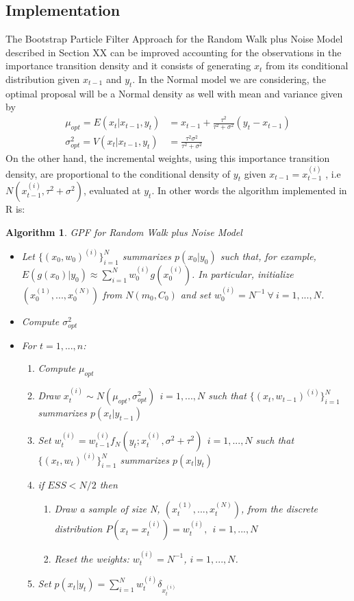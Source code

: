 \documentclass[
]{book}
\theoremstyle{break}
\theoremstyle{nonumberplain}
\newtheorem{algorithm}{Algorithm}[section]
\begin{document}
\subsection{Implementation}

\hfill\break
The Bootstrap Particle Filter Approach for the Random Walk plus Noise
Model described in Section XX can be improved accounting for the
observations in the importance transition density and it consists of
generating \(x_{t}\) from its conditional distribution given \(x_{t-1}\)
and \(y_{t}\). In the Normal model we are considering, the optimal
proposal will be a Normal density as well with mean and variance given
by \begin{align*}
\mu_{opt}=E(x_{t}|x_{t-1},y_{t})&=x_{t-1}+\frac{\tau^{2}}{\tau^{2}+\sigma^{2}}(y_{t}-x_{t-1})\\
\sigma_{opt}^{2}=V(x_{t}|x_{t-1},y_{t})&=\frac{\tau^{2}\sigma^{2}}{\tau^{2}+\sigma^{2}}
\end{align*} On the other hand, the incremental weights, using this
importance transition density, are proportional to the conditional
density of \(y_{t}\) given \(x_{t-1}=x_{t-1}^{(i)}\) , i.e
\(N(x_{t-1}^{(i)},\tau^{2}+\sigma^{2})\), evaluated at \(y_{t}\). In
other words the algorithm implemented in R is:

\begin{algorithm} GPF for Random Walk plus Noise Model
\begin{itemize}
\item Let $\{(x_{0},w_{0})^{(i)}\}_{i=1}^{N}$ summarizes $p(x_{0}|y_{0})$ such that, for example, $E(g(x_{0})|y_{0}) \approx \sum_{i=1}^{N}w_{0}^{(i)}g(x_{0}^{(i)})$. In particular, initialize $(x_{0}^{(1)},...,x_{0}^{(N)})$ from $N(m_{0},C_{0})$ and set $w_{0}^{(i)}=N^{-1} \ \forall \ i=1,...,N$.
\item Compute $\sigma_{opt}^{2}$ 
\item For $t=1,...,n$:
\begin{enumerate}
\item Compute $\mu_{opt}$
\item Draw $x_{t}^{(i)} \sim N(\mu_{opt},\sigma_{opt}^{2}) \ \ i=1,...,N$ such that $\{(x_{t},w_{t-1})^{(i)}\}_{i=1}^{N}$ summarizes $p(x_{t}|y_{t-1})$
\item Set $w_{t}^{(i)} = w_{t-1}^{(i)}f_{N}(y_{t};x_{t}^{(i)},\sigma^2+\tau^{2}) \ \ i=1,...,N$ such that $\{(x_{t},w_{t})^{(i)}\}_{i=1}^{N}$ summarizes $p(x_{t}|y_{t})$
\item if $ESS<N/2$ then
\begin{enumerate}
\item Draw a sample of size N, $(x_{t}^{(1)},...,x_{t}^{(N)})$, from the discrete distribution $P(x_{t}=x_{t}^{(i)})=w_{t}^{(i)},\ \ i=1,...,N$
\item Reset the weights: $w_{t}^{(i)}=N^{-1}$, $i=1,...,N$.
\end{enumerate}
\item Set $p(x_{t}|y_{t})=\sum_{i=1}^{N}w_{t}^{(i)}\delta_{x_{t}^{(i)}}$
\end{enumerate}
\end{itemize}
\end{algorithm}
\end{document}
